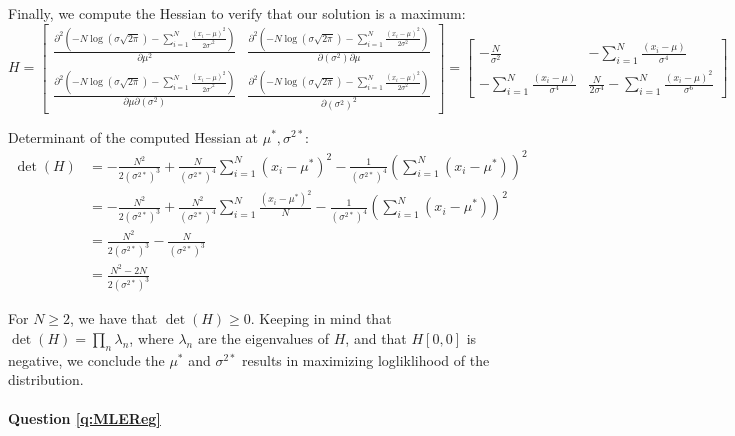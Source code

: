     Finally, we compute the Hessian to verify that our solution is a maximum:
    $$H = \begin{bmatrix}
            \frac{\partial^2 (-N \log (\sigma \sqrt{2\pi}) - \sum_{i=1}^N \frac{(x_i - \mu)^2}{2\sigma'^2})}{\partial \mu^2} & 
            \frac{\partial^2 (-N \log (\sigma \sqrt{2\pi}) - \sum_{i=1}^N \frac{(x_i - \mu)^2}{2\sigma^2})}{\partial (\sigma^2) \partial \mu} \\ 
            \frac{\partial^2 (-N \log (\sigma \sqrt{2\pi}) - \sum_{i=1}^N \frac{(x_i - \mu)^2}{2\sigma'^2})}{\partial \mu \partial (\sigma^2)} & 
            \frac{\partial^2 (-N \log (\sigma \sqrt{2\pi}) - \sum_{i=1}^N \frac{(x_i - \mu)^2}{2\sigma^2})}{\partial (\sigma^2)^2} 
        \end{bmatrix} = 
        \begin{bmatrix} 
            -\frac{N}{\sigma^2} &  
            - \sum_{i=1}^N \frac{(x_i - \mu)}{\sigma^4} \\ 
            - \sum_{i=1}^N \frac{(x_i - \mu) }{\sigma^4} & 
            \frac{N}{2 \sigma^4} - \sum_{i=1}^N \frac{(x_i - \mu)^2}{\sigma^6} 
        \end{bmatrix}$$
    
    Determinant of the computed Hessian at $\mu^*, \sigma^{2*}$:
\begin{align}
\det(H) &= -\frac{N^2}{2 (\sigma^{2*})^3} + \frac{N}{(\sigma^{2*})^4} \sum_{i=1}^N (x_i - \mu^*)^2 - \frac{1}{(\sigma^{2*})^4} (\sum_{i=1}^N(x_i - \mu^*))^2 \\
&= -\frac{N^2}{2 (\sigma^{2*})^3} + \frac{N^2}{(\sigma^{2*})^4} \sum_{i=1}^N \frac{(x_i - \mu^{*})^2}{N} - \frac{1}{(\sigma^{2*})^4} (\sum_{i=1}^N(x_i - \mu^{*}))^2 \\
&= \frac{N^2}{2 (\sigma^{2*})^3}  - \frac{N}{(\sigma^{2*})^3} \\
&= \frac{N^2 -2N}{2 (\sigma^{2*})^3}
\end{align}

For $N \geq 2$, we have that $\det(H) \geq 0$. Keeping in mind that $\det(H) = \prod_n \lambda_n$, where $\lambda_n$ are the eigenvalues of $H$, and that $H[0,0]$ is negative, we conclude the $\mu^*$ and $\sigma^{2*}$ results in maximizing logliklihood of the distribution.

    
    

\paragraph{Question \ref{q:MLEReg}}


